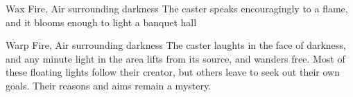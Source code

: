   {}%
  {Wax}%
  {Fire, Air}%
  {surrounding darkness}%
  {The caster speaks encouragingly to a flame, and it blooms enough to light a banquet hall}%
  {}

  {}%
  {Warp}%
  {Fire, Air}%
  {surrounding darkness}%
  {The caster laughts in the face of darkness, and any minute light in the area lifts from its source, and wanders free.}%
  {Most of these floating lights follow their creator, but others leave to seek out their own goals.
  Their reasons and aims remain a mystery.}

